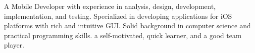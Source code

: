 \documentclass[letter,10pt]{article}
\begin{document}



A Mobile Developer with experience in analysis, design, development, implementation, and testing. Specialized in developing applications for iOS platforms with rich and intuitive GUI. Solid background in computer science and practical programming skills. a self-motivated, quick learner, and a good team player.
\end{document}
